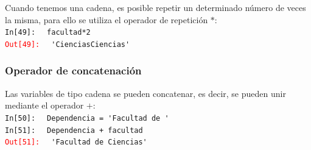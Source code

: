 \documentclass[12pt]{beamer}
\begin{document}
{\begin{frame}[fragile]
Cuando tenemos una cadena, es posible repetir un determinado número de veces la misma, para ello se utiliza el operador de repetición $*$:
\\
\bigskip
\pause
\textcolor{ao}{\texttt{In[49]: }} \verb| facultad*2|
\\
\pause
\textcolor{red}{\texttt{Out[49]: }} \verb| 'CienciasCiencias'|
\end{frame}
\begin{frame}[fragile]
\frametitle{Operador de concatenación}
Las variables de tipo cadena se pueden concatenar, es decir, se pueden unir mediante el operador $+$:
\\
\bigskip
\pause
\textcolor{ao}{\texttt{In[50]: }} \verb| Dependencia = 'Facultad de '|
\\
\pause
\textcolor{ao}{\texttt{In[51]: }} \verb| Dependencia + facultad|
\\
\pause
\textcolor{red}{\texttt{Out[51]: }} \verb| 'Facultad de Ciencias'|
\end{frame}
}
\end{document}
